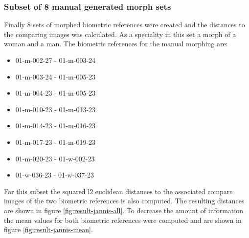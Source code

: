 \subsubsection{Subset of 8 manual generated morph sets}
\label{sec:subsetman}
Finally 8 sets of morphed biometric references were created and the distances to the comparing images was calculated. As a speciality in this set a morph of a woman and a man.
The biometric references for the manual morphing are:
\begin{multicols}{2}
\begin{itemize}
\item 01-m-002-27 - 01-m-003-24
\item 01-m-003-24 - 01-m-005-23
\item 01-m-004-23 - 01-m-005-23
\item 01-m-010-23 - 01-m-013-23
\item 01-m-014-23 - 01-m-016-23
\item 01-m-017-23 - 01-m-019-23
\item 01-m-020-23 - 01-w-002-23
\item 01-w-036-23 - 01-w-037-23
\end{itemize}
\end{multicols}
For this subset the squared l2 euclidean distances to the associated compare images of the two biometric references is also computed. The resulting distances are shown in figure \ref{fig:result-jannis-all}. To decrease the amount of information the mean values for both biometric references were computed and are shown in figure \ref{fig:result-jannis-mean}.

